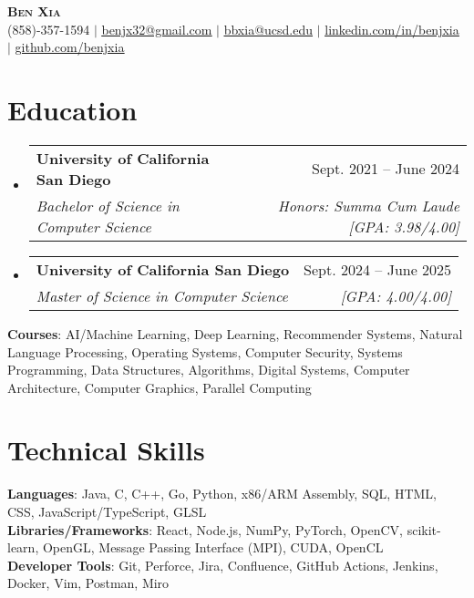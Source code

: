 \documentclass[letterpaper, 10pt]{article}
\makeatletter
\newcommand{\resumeSubheading}[4]{
  \vspace{4pt}\item
    \begin{tabular*}{0.97\textwidth}[t]{l@{\extracolsep{\fill}}r}
      \textbf{#1} & #2 \\
      \textit{#3} & \textit{\small #4} \\
    \end{tabular*}\vspace{-7pt}
}
\newcommand{\resumeSubHeadingListStart}{\begin{itemize}[leftmargin=0.15in, label={}]}
\newcommand{\resumeSubHeadingListEnd}{\end{itemize}}
\makeatother
\begin{document}

\begin{center}
  \textbf{\Huge \scshape Ben Xia} \uline{} \\ \vspace{1pt}
  \small (858)-357-1594 $|$
  \href{mailto:benjx32@gmail.com}{\uline{benjx32@gmail.com}} $|$
  \href{mailto:bbxia@ucsd.edu}{\uline{bbxia@ucsd.edu}} $|$
  \href{https://linkedin.com/in/benjxia}{\uline{linkedin.com/in/benjxia}} $|$
  \href{https://github.com/benjxia}{\uline{github.com/benjxia}}
\end{center}



\section{Education}
  \resumeSubHeadingListStart
  \resumeSubheading
      {University of California San Diego}{Sept. 2021 -- June 2024}
      {Bachelor of Science in Computer Science}{Honors: Summa Cum Laude [GPA: 3.98/4.00]}
  \resumeSubheading
      {University of California San Diego}{Sept. 2024 -- June 2025}
      {Master of Science in Computer Science}{[GPA: 4.00/4.00]}
  \resumeSubHeadingListEnd
  \begin{itemize}[leftmargin=0.15in, label={}]
    \small{\item{
     \textbf{Courses}{: AI/Machine Learning, Deep Learning, Recommender Systems, Natural Language Processing, Operating Systems, Computer Security, Systems Programming, Data Structures, Algorithms, Digital Systems, Computer Architecture, Computer Graphics, Parallel Computing } \\
    }}
 \end{itemize}

%
\section{Technical Skills}
 \begin{itemize}[leftmargin=0.15in, label={}]
    \small{\item{
     \textbf{Languages}{: Java, C, C++, Go, Python, x86/ARM Assembly, SQL, HTML, CSS, JavaScript/TypeScript, GLSL } \\
     \textbf{Libraries/Frameworks}{: React, Node.js, NumPy, PyTorch, OpenCV, scikit-learn, OpenGL, Message Passing Interface (MPI), CUDA, OpenCL } \\
     \textbf{Developer Tools}{: Git, Perforce, Jira, Confluence, GitHub Actions, Jenkins, Docker, Vim, Postman, Miro} \\
    }}
 \end{itemize}
\end{document}
